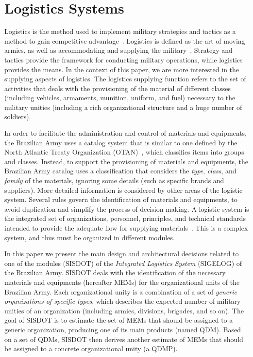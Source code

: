 \section{Logistics Systems}
\label{sec:logistics}

Logistics is the method used to implement military strategies and tactics as a method to gain 
competitive advantage~\cite{rutner2012}. Logistics is defined as the art of moving armies, 
as well as accommodating and supplying the military~\cite{prebilic2006}. Strategy and tactics 
provide the framework for conducting military operations, while logistics provides the means.
In the context of this paper, we are more interested in the supplying aspects of logistics. 
The logistics supplying function refers to the set of activities that deals with the  provisioning of 
the material of different classes (including vehicles, armaments, munition, uniform, and fuel) necessary to the 
military unities (including a rich organizational structure and a huge number of soldiers). 

In order to facilitate the administration and control of materials and equipments, the Brazilian Army uses a 
catalog system that is similar to one defined by the North Atlantic Treaty Organization (OTAN)~\cite{otan2012}, 
which classifies items into groups and classes. Instead, to support the provisioning of materials and equipments, 
the Brazilian Army catalog uses a classification that considers the \emph{type}, \emph{class}, and \emph{family} of the 
materials, ignoring some details (such as specific brands and suppliers). More detailed information is considered by 
other areas of the logistic system. Several rules govern the identification of materials and equipments, 
to avoid duplication and simplify the process of decision making. A logistic system is the integrated set of organizations, 
personnel, principles, and technical standards intended to provide the adequate flow for supplying materials~\cite{brasil2003}. 
This is a complex system, and thus must be organized in different modules. 

In this paper we present the main design and architectural decisions related to one of the modules (SISDOT) of the \emph{Integrated 
Logistics System} (SIGELOG) of the Brazilian Army. SISDOT deals with the identification of the necessary 
materials and equipments (hereafter MEMs) for the organizational units of the Brazilian Army. Each organizational 
unity is a combination of a set of \emph{generic organizations of specific types}, which describes the expected 
number of military unities of an organization (including armies, divisions, brigades, and so on). The goal of 
SISDOT is to estimate the set of MEMs that should be assigned to a generic organization, producing 
one of its main products (named QDM). Based on a set of QDMs, SISDOT then derives another estimate 
of MEMs that should be assigned to a concrete organizational unity (a QDMP). 

